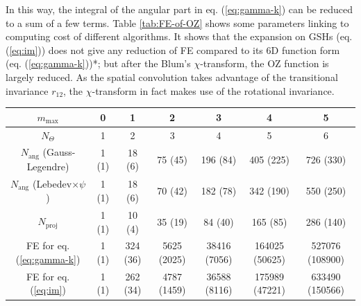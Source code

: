 In this way, the integral of the angular part in eq. (\ref{eq:gamma-k})
can be reduced to a sum of a few terms. Table \ref{tab:FE-of-OZ}
shows some parameters linking to computing cost of different algorithms.
It
shows that the expansion on \acs{GSH}s (eq. (\ref{eq:im})) does
not give any reduction of \acs{FE} compared to its 6D function form
(eq. (\ref{eq:gamma-k})){*}; but after the Blum's $\chi$-transform,
the \acs{OZ} function is largely reduced. As the spatial convolution
takes advantage of the transitional invariance $r_{12}$, the $\chi$-transform
in fact makes use of the rotational invariance.

\begin{table}[h]
\centering{}\hspace{-4em}%
\noindent\begin{minipage}[t]{1.1\columnwidth}%
\begin{center}
\begin{tabular*}{1\textwidth}{@{\extracolsep{\fill}}ccccccc}
\toprule 
{\footnotesize{}$m_{\mathrm{max}}$} & {\footnotesize{}0} & {\footnotesize{}1} & {\footnotesize{}2} & {\footnotesize{}3} & {\footnotesize{}4} & {\footnotesize{}5}\tabularnewline
\midrule
{\footnotesize{}$N_{\Theta}$} & {\footnotesize{}1} & {\footnotesize{}2} & {\footnotesize{}3} & {\footnotesize{}4} & {\footnotesize{}5} & {\footnotesize{}6}\tabularnewline
{\footnotesize{}$N_{\mathrm{ang}}$ (Gauss-Legendre)} & {\footnotesize{}1 (1)} & {\footnotesize{}18 (6)} & {\footnotesize{}75 (45)} & {\footnotesize{}196 (84)} & {\footnotesize{}405 (225)} & {\footnotesize{}726 (330)}\tabularnewline
{\footnotesize{}$N_{\mathrm{ang}}$ (Lebedev$\times\psi$)} & {\footnotesize{}1 (1)} & {\footnotesize{}18 (6)} & {\footnotesize{}70 (42)} & {\footnotesize{}182 (78)} & {\footnotesize{}342 (190)} & {\footnotesize{}550 (250)}\tabularnewline
{\footnotesize{}$N_{\mathrm{proj}}$ } & {\footnotesize{}1 (1)} & {\footnotesize{}10 (4)} & {\footnotesize{}35 (19)} & {\footnotesize{}84 (40)} & {\footnotesize{}165 (85)} & {\footnotesize{}286 (140)}\tabularnewline
{\footnotesize{}FE for eq. (\ref{eq:gamma-k})} & {\footnotesize{}1 (1)} & {\footnotesize{}324 (36)} & {\footnotesize{}5625 (2025)} & {\footnotesize{}38416 (7056)} & {\footnotesize{}164025 (50625)} & {\footnotesize{}527076 (108900)}\tabularnewline
{\footnotesize{}FE for eq. (\ref{eq:im})} & {\footnotesize{}1 (1)} & {\footnotesize{}262 (34)} & {\footnotesize{}4787 (1459)} & {\footnotesize{}36588 (8116)} & {\footnotesize{}175989 (47221)} & {\footnotesize{}633490 (150566)}\tabularnewline

\end{tabular*}
\end{center}
\end{minipage}
\end{table}
